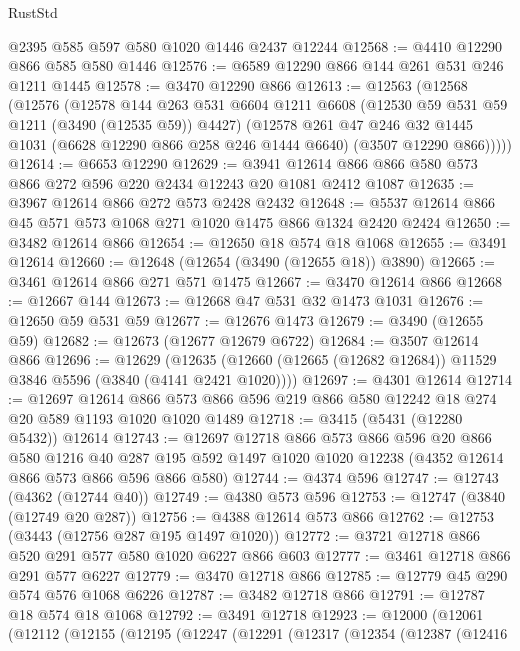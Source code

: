 \begin{lexlean}{RustStd}
\begin{coremodule}
    @2395
    @585
    @597
    @580
    @1020
    @1446
    @2437
    @12244
@12568 := @4410 @12290 @866 @585 @580 @1446
@12576 := @6589 @12290 @866 @144 @261 @531 @246 @1211 @1445
@12578 := @3470 @12290 @866
@12613 := @12563
    (@12568
      (@12576
        (@12578
          @144
          @263
          @531
          @6604
          @1211
          @6608
          (@12530 @59 @531 @59 @1211 (@3490 (@12535 @59)) @4427)
          (@12578
            @261
            @47
            @246
            @32
            @1445
            @1031
            (@6628 @12290 @866 @258 @246 @1444 @6640)
            (@3507 @12290 @866)))))
@12614 := @6653 @12290
@12629 := @3941 @12614 @866 @866 @580 @573 @866 @272 @596 @220 @2434 @12243 @20 @1081 @2412 @1087
@12635 := @3967 @12614 @866 @272 @573 @2428 @2432
@12648 := @5537 @12614 @866 @45 @571 @573 @1068 @271 @1020 @1475 @866 @1324 @2420 @2424
@12650 := @3482 @12614 @866
@12654 := @12650 @18 @574 @18 @1068
@12655 := @3491 @12614
@12660 := @12648 (@12654 (@3490 (@12655 @18)) @3890)
@12665 := @3461 @12614 @866 @271 @571 @1475
@12667 := @3470 @12614 @866
@12668 := @12667 @144
@12673 := @12668 @47 @531 @32 @1473 @1031
@12676 := @12650 @59 @531 @59
@12677 := @12676 @1473
@12679 := @3490 (@12655 @59)
@12682 := @12673 (@12677 @12679 @6722)
@12684 := @3507 @12614 @866
@12696 := @12629
    (@12635 (@12660 (@12665 (@12682 @12684)) @11529 @3846 @5596 (@3840 (@4141 @2421 @1020))))
@12697 := @4301 @12614
@12714 := @12697
    @12614
    @866
    @573
    @866
    @596
    @219
    @866
    @580
    @12242
    @18
    @274
    @20
    @589
    @1193
    @1020
    @1020
    @1489
@12718 := @3415 (@5431 (@12280 @5432)) @12614
@12743 := @12697
    @12718
    @866
    @573
    @866
    @596
    @20
    @866
    @580
    @1216
    @40
    @287
    @195
    @592
    @1497
    @1020
    @1020
    @12238
    (@4352 @12614 @866 @573 @866 @596 @866 @580)
@12744 := @4374 @596
@12747 := @12743 (@4362 (@12744 @40))
@12749 := @4380 @573 @596
@12753 := @12747 (@3840 (@12749 @20 @287))
@12756 := @4388 @12614 @573 @866
@12762 := @12753 (@3443 (@12756 @287 @195 @1497 @1020))
@12772 := @3721 @12718 @866 @520 @291 @577 @580 @1020 @6227 @866 @603
@12777 := @3461 @12718 @866 @291 @577 @6227
@12779 := @3470 @12718 @866
@12785 := @12779 @45 @290 @574 @576 @1068 @6226
@12787 := @3482 @12718 @866
@12791 := @12787 @18 @574 @18 @1068
@12792 := @3491 @12718
@12923 := @12000
    (@12061
      (@12112
        (@12155
          (@12195
            (@12247
              (@12291
                (@12317
                  (@12354
                    (@12387
                      (@12416

\end{coremodule}
\end{lexlean}

